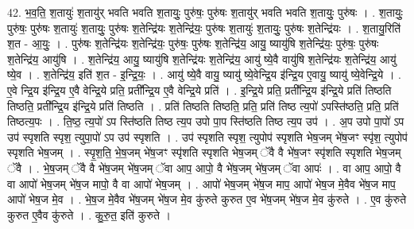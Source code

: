 \documentclass[17pt]{extarticle}
\begin{document}
42. भ॒व॒ति॒ श॒तायुः॑ श॒तायु॑र् भवति भवति श॒तायुः॒ पुरु॑षः॒ पुरु॑षः श॒तायु॑र् भवति भवति श॒तायुः॒ पुरु॑षः । . श॒तायुः॒ पुरु॑षः॒ पुरु॑षः श॒तायुः॑ श॒तायुः॒ पुरु॑षः श॒तेन्द्रि॑यः श॒तेन्द्रि॑यः॒ पुरु॑षः श॒तायुः॑ श॒तायुः॒ पुरु॑षः श॒तेन्द्रि॑यः । . श॒तायु॒रिति॑ श॒त - आ॒युः॒ । . पुरु॑षः श॒तेन्द्रि॑यः श॒तेन्द्रि॑यः॒ पुरु॑षः॒ पुरु॑षः श॒तेन्द्रि॑य॒ आयु॒ ष्यायु॑षि श॒तेन्द्रि॑यः॒ पुरु॑षः॒ पुरु॑षः श॒तेन्द्रि॑य॒ आयु॑षि । . श॒तेन्द्रि॑य॒ आयु॒ ष्यायु॑षि श॒तेन्द्रि॑यः श॒तेन्द्रि॑य॒ आयु॑ ष्ये॒वै वायु॑षि श॒तेन्द्रि॑यः श॒तेन्द्रि॑य॒ आयु॑ ष्ये॒व । . श॒तेन्द्रि॑य॒ इति॑ श॒त - इ॒न्द्रि॒यः॒ । . आयु॑ ष्ये॒वै वायु॒ ष्यायु॑ ष्ये॒वेन्द्रि॒य इ॑न्द्रि॒य ए॒वायु॒ ष्यायु॑ ष्ये॒वेन्द्रि॒ये । . ए॒वे न्द्रि॒य इ॑न्द्रि॒य ए॒वै वेन्द्रि॒ये प्रति॒ प्रती᳚न्द्रि॒य ए॒वै वेन्द्रि॒ये प्रति॑ । . इ॒न्द्रि॒ये प्रति॒ प्रती᳚न्द्रि॒य इ॑न्द्रि॒ये प्रति॑ तिष्ठति तिष्ठति॒ प्रती᳚न्द्रि॒य इ॑न्द्रि॒ये प्रति॑ तिष्ठति । . प्रति॑ तिष्ठति तिष्ठति॒ प्रति॒ प्रति॑ तिष्ठ त्य॒पो॑ ऽपस्ति॑ष्ठति॒ प्रति॒ प्रति॑ तिष्ठत्य॒पः । . ति॒ष्ठ॒ त्य॒पो॑ ऽप स्ति॑ष्ठति तिष्ठ त्य॒प उपो पा॒प स्ति॑ष्ठति तिष्ठ त्य॒प उप॑ । . अ॒प उपो पा॒पो॑ ऽप उप॑ स्पृशति स्पृश॒ त्युपा॒पो॑ ऽप उप॑ स्पृशति । . उप॑ स्पृशति स्पृश॒ त्युपोप॑ स्पृशति भेष॒जम् भे॑ष॒जꣳ स्पृ॑श॒ त्युपोप॑ स्पृशति भेष॒जम् । . स्पृ॒श॒ति॒ भे॒ष॒जम् भे॑ष॒जꣳ स्पृ॑शति स्पृशति भेष॒जम् ॅवै वै भे॑ष॒जꣳ स्पृ॑शति स्पृशति भेष॒जम् ॅवै । . भे॒ष॒जम् ॅवै वै भे॑ष॒जम् भे॑ष॒जम् ॅवा आप॒ आपो॒ वै भे॑ष॒जम् भे॑ष॒जम् ॅवा आपः॑ । . वा आप॒ आपो॒ वै वा आपो॑ भेष॒जम् भे॑ष॒ज मापो॒ वै वा आपो॑ भेष॒जम् । . आपो॑ भेष॒जम् भे॑ष॒ज माप॒ आपो॑ भेष॒ज मे॒वैव भे॑ष॒ज माप॒ आपो॑ भेष॒ज मे॒व । . भे॒ष॒ज मे॒वैव भे॑ष॒जम् भे॑ष॒ज मे॒व कु॑रुते कुरुत ए॒व भे॑ष॒जम् भे॑ष॒ज मे॒व कु॑रुते । . ए॒व कु॑रुते कुरुत ए॒वैव कु॑रुते । . कु॒रु॒त॒ इति॑ कुरुते । \newline
\pagebreak
{}
\end{document}
